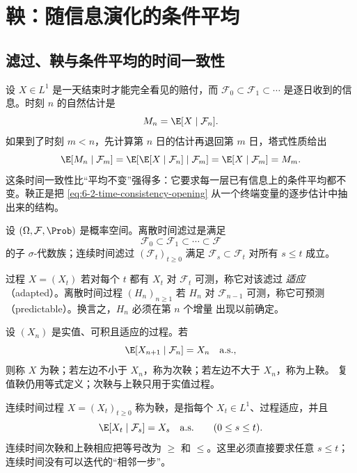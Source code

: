 \section{鞅：随信息演化的条件平均}\label{sec:06-02}

\subsection{滤过、鞅与条件平均的时间一致性}\label{subsec:6-2-1}

设 $X\in L^1$ 是一天结束时才能完全看见的赔付，而
$\mathcal F_0\subset\mathcal F_1\subset\cdots$ 是逐日收到的信息。时刻 $n$ 的自然估计是
\[
  M_n=\E[X\mid\mathcal F_n].
\]
如果到了时刻 $m<n$，先计算第 $n$ 日的估计再退回第 $m$ 日，塔式性质给出
\begin{equation}\label{eq:6-2-time-consistency-opening}
  \E[M_n\mid\mathcal F_m]
  =\E[\E[X\mid\mathcal F_n]\mid\mathcal F_m]
  =\E[X\mid\mathcal F_m]=M_m.
\end{equation}
这条时间一致性比“平均不变”强得多：它要求每一层已有信息上的条件平均都不变。鞅正是把
\eqref{eq:6-2-time-consistency-opening} 从一个终端变量的逐步估计中抽出来的结构。

\begin{definition}[滤过与适应性]\label{def:6-2-1-1}
设 $(\Omega,\mathcal F,\Prob)$ 是概率空间。离散时间滤过是满足
\[
  \mathcal F_0\subset\mathcal F_1\subset\cdots\subset\mathcal F
\]
的子 $\sigma$-代数族；连续时间滤过 $(\mathcal F_t)_{t\ge0}$ 满足
$\mathcal F_s\subset\mathcal F_t$ 对所有 $s\le t$ 成立。

过程 $X=(X_t)$ 若对每个 $t$ 都有 $X_t$ 对 $\mathcal F_t$ 可测，称它对该滤过
\emph{适应}（adapted）。离散时间过程 $(H_n)_{n\ge1}$ 若 $H_n$ 对
$\mathcal F_{n-1}$ 可测，称它可预测（predictable）。换言之，$H_n$ 必须在第 $n$ 个增量
出现以前确定。
\end{definition}

\begin{definition}[鞅、次鞅与上鞅]\label{def:6-2-1-2}
设 $(X_n)$ 是实值、可积且适应的过程。若
\[
  \E[X_{n+1}\mid\mathcal F_n]=X_n\quad\text{a.s.},
\]
则称 $X$ 为鞅；若左边不小于 $X_n$，称为次鞅；若左边不大于 $X_n$，称为上鞅。
复值鞅仍用等式定义；次鞅与上鞅只用于实值过程。

连续时间过程 $X=(X_t)_{t\ge0}$ 称为鞅，是指每个 $X_t\in L^1$、过程适应，并且
\[
  \E[X_t\mid\mathcal F_s]=X_s\quad\text{a.s.}\qquad(0\le s\le t).
\]
连续时间次鞅和上鞅相应把等号改为 $\ge$ 和 $\le$。这里必须直接要求任意 $s\le t$；
连续时间没有可以迭代的“相邻一步”。
\end{definition}

